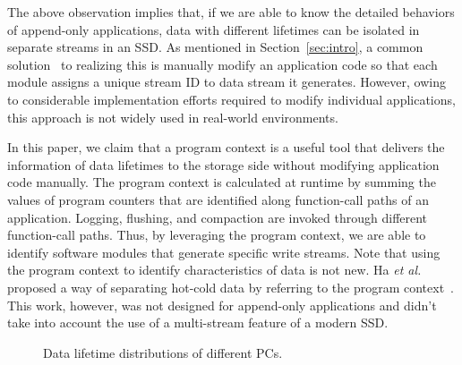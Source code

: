 The above observation implies that, if we are able to know the detailed
behaviors of append-only applications, data with different lifetimes can be
isolated in separate streams in an SSD. As mentioned in Section~\ref{sec:intro}, a
common solution~\cite{MultiStream} to realizing this is manually modify an
application code so that each module assigns a unique stream ID to data stream
it generates. However, owing to considerable implementation efforts
required to modify individual applications, this approach is not widely used in
real-world environments.

In this paper, we claim that a program context is a useful tool that delivers
the information of data lifetimes to the storage side without modifying application
code manually. The program context is calculated at runtime by summing the
values of program counters that are identified along function-call paths
of an application. Logging, flushing, and compaction are invoked through
different function-call paths. Thus, by leveraging the program context, we are
able to identify software modules that generate specific write streams. Note
that using the program context to identify characteristics of data is not new.
Ha \textit{et al.} proposed a way of separating hot-cold data by referring to the program
context~\cite{PCHa}. This work, however, was not designed for append-only
applications and didn't take into account the use of a multi-stream feature of
a modern SSD.

\begin{figure}[!t]
\centering
\hspace{1pt}
\hfill
\vspace{-10pt}
\caption{Data lifetime distributions of different PCs.} 
\label{fig:types_and_PCs}
\vspace{-15pt}
\end{figure}

